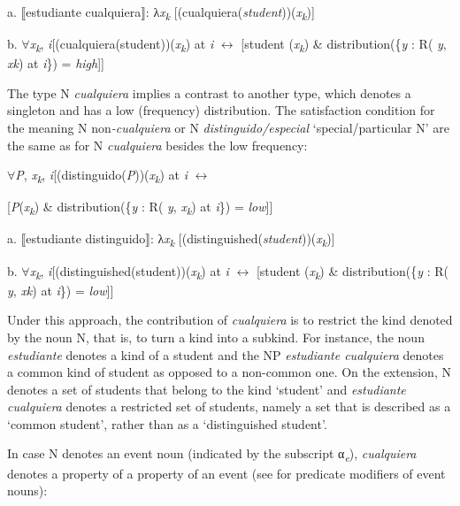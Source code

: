   a.  ⟦estudiante cualquiera⟧: λ\textit{x\textsubscript{k}} [(cualquiera(\textit{student}))(\textit{x\textsubscript{k}})]

  b.  ${\forall}$\textit{x\textsubscript{k}}, \textit{i}[(cualquiera(student))(\textit{x\textsubscript{k}}) at \textit{i} $\leftrightarrow $ [student (\textit{x\textsubscript{k}}) \& distribution(\{\textit{y} : R( \textit{y}, \textit{xk}) at \textit{i}\}) = \textit{high}]]

The type N \textit{cualquiera} implies a contrast to another type, which denotes a singleton and has a low (frequency) distribution. The satisfaction condition for the meaning N non\textit{{}-cualquiera} or N \textit{distinguido/especial} ‘special/particular N’ are the same as for N \textit{cualquiera} besides the low frequency:

    ${\forall}$\textit{P}, \textit{x\textsubscript{k}}, \textit{i}[(distinguido(\textit{P}))(\textit{x\textsubscript{k}}) at \textit{i} $\leftrightarrow $

    [\textit{P}(\textit{x\textsubscript{k}}) \& distribution(\{\textit{y} : R( \textit{y}, \textit{x\textsubscript{k}}) at \textit{i}\}) = \textit{low}]]

  a.  ⟦estudiante distinguido⟧: λ\textit{x\textsubscript{k}} [(distinguished(\textit{student}))(\textit{x\textsubscript{k}})]

  b.  ${\forall}$\textit{x\textsubscript{k}}, \textit{i}[(distinguished(student))(\textit{x\textsubscript{k}}) at \textit{i} $\leftrightarrow $ [student (\textit{x\textsubscript{k}}) \& distribution(\{\textit{y} : R( \textit{y}, \textit{xk}) at \textit{i}\}) = \textit{low}]]

Under this approach, the contribution of \textit{cualquiera} is to restrict the kind denoted by the noun N, that is, to turn a kind into a subkind. For instance, the noun \textit{estudiante} denotes a kind of a student and the NP \textit{estudiante cualquiera} denotes a common kind of student as opposed to a non-common one. On the extension, N denotes a set of students that belong to the kind ‘student’ and \textit{estudiante cualquiera} denotes a restricted set of students, namely a set that is described as a ‘common student’, rather than as a ‘distinguished student’. 

  In case N denotes an event noun (indicated by the subscript α\textit{\textsubscript{e}}), \textit{cualquiera} denotes a property of a property of an event (see \citealt{GehrkeMcNally2015} for predicate modifiers of event nouns):

